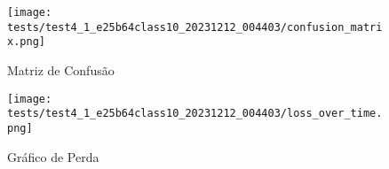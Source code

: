 \begin{figure}[ht]
 \begin{center}
   \texttt{[image: tests/test4\_1\_e25b64class10\_20231212\_004403/confusion\_matrix.png]}
  \caption{Matriz de Confusão}
  \label{fig:fig03}
 \end{center}
\end{figure}

\begin{figure}[ht]
 \begin{center}
   \texttt{[image: tests/test4\_1\_e25b64class10\_20231212\_004403/loss\_over\_time.png]}
  \caption{Gráfico de Perda}
  \label{fig:fig04}
 \end{center}
\end{figure}
